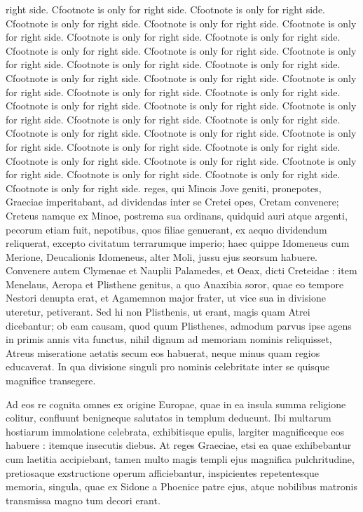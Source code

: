 \documentclass{article}
\begin{document}
\begin{pages}
\begin{Rightside}
{{right side. Cfootnote is only for right side. Cfootnote is only for right side. Cfootnote is only for right side. Cfootnote is only for right side. Cfootnote is only for right side. Cfootnote is only for right side. Cfootnote is only for right side. Cfootnote is only for right side. Cfootnote is only for right side. Cfootnote is only for right side. Cfootnote is only for right side. Cfootnote is only for right side. Cfootnote is only for right side. Cfootnote is only for right side. Cfootnote is only for right side. Cfootnote is only for right side. Cfootnote is only for right side. Cfootnote is only for right side. Cfootnote is only for right side. Cfootnote is only for right side. Cfootnote is only for right side. Cfootnote is only for right side. Cfootnote is only for right side. Cfootnote is only for right side. Cfootnote is only for right side. Cfootnote is only for right side. Cfootnote is only for right side. Cfootnote is only for right side. Cfootnote is only for right side. Cfootnote is only for right side. Cfootnote is only for right side. Cfootnote is only for right side. Cfootnote is only for right side.%
}} reges, qui Minois Jove geniti, pronepotes, Graeciae imperitabant, ad dividendas inter se Cretei opes, Cretam convenere; Creteus namque ex Minoe, postrema sua ordinans, quidquid auri atque argenti, pecorum etiam fuit, nepotibus, quos filiae genuerant, ex aequo dividendum reliquerat, excepto civitatum terrarumque imperio; haec quippe Idomeneus cum Merione, Deucalionis Idomeneus, alter Moli, jussu ejus seorsum habuere. Convenere autem Clymenae et Nauplii Palamedes, et Oeax, dicti Creteidae : item Menelaus, Aeropa et Plisthene genitus, a quo Anaxibia soror, quae eo tempore Nestori denupta erat, et Agamemnon major frater, ut vice sua in divisione uteretur, petiverant. Sed hi non Plisthenis, ut erant, magis quam Atrei dicebantur; ob eam causam, quod quum Plisthenes, admodum parvus ipse agens in primis annis vita functus, nihil dignum ad memoriam nominis reliquisset, Atreus miseratione aetatis secum eos habuerat, neque minus quam regios educaverat. In qua divisione singuli pro nominis celebritate inter se quisque magnifice transegere.

Ad eos re cognita omnes ex origine Europae, quae in ea insula summa religione colitur, confluunt benigneque salutatos in templum deducunt. Ibi multarum hostiarum immolatione celebrata, exhibitisque epulis, largiter magnificeque eos habuere : itemque insecutis diebus. At reges Graeciae, etsi ea quae exhibebantur cum laetitia accipiebant, tamen multo magis templi ejus magnifica pulchritudine, pretiosaque exstructione operum afficiebantur, inspicientes repetentesque memoria, singula, quae ex Sidone a Phoenice patre ejus, atque nobilibus matronis transmissa magno tum decori erant.


\end{Rightside}
\end{pages}
\end{document}
